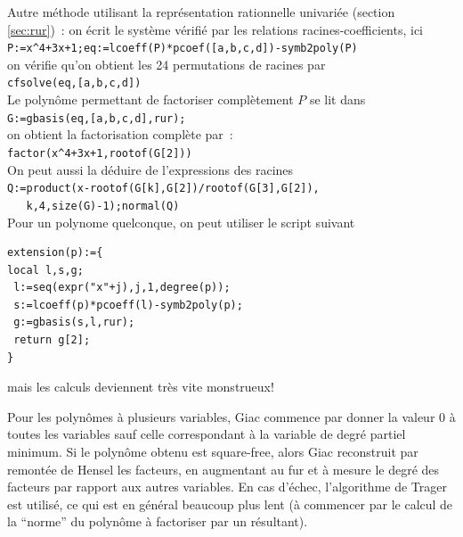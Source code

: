 \documentclass[a4paper,11pt]{article}
\begin{document}
\begin{giacjshere}
Autre m\'ethode utilisant la repr\'esentation rationnelle
univari\'ee (section \ref{sec:rur})~: 
on \'ecrit le syst\`eme v\'erifi\'e par les relations
racines-coefficients, ici\\
\verb|P:=x^4+3x+1;eq:=lcoeff(P)*pcoef([a,b,c,d])-symb2poly(P)|\\
on v\'erifie qu'on obtient les 24 permutations de racines par\\
\verb|cfsolve(eq,[a,b,c,d])|\\
Le polyn\^ome permettant de factoriser compl\`etement $P$ se lit dans\\
\verb|G:=gbasis(eq,[a,b,c,d],rur);|\\
on obtient la factorisation compl\`ete par~:\\
\verb|factor(x^4+3x+1,rootof(G[2]))|\\
On peut aussi la d\'eduire de l'expressions des racines\\
\verb|Q:=product(x-rootof(G[k],G[2])/rootof(G[3],G[2]),|\\
\verb|   k,4,size(G)-1);normal(Q)|\\
Pour un polynome quelconque, on peut utiliser le script suivant\\
\begin{verbatim}
extension(p):={
local l,s,g;
 l:=seq(expr("x"+j),j,1,degree(p));
 s:=lcoeff(p)*pcoeff(l)-symb2poly(p);
 g:=gbasis(s,l,rur);
 return g[2];
}
\end{verbatim}
mais les calculs deviennent tr\`es vite monstrueux!

Pour les polyn\^omes \`a plusieurs variables, Giac commence par donner
la valeur 0 \`a toutes les variables sauf celle correspondant \`a la variable de
degr\'e partiel minimum. Si le polyn\^ome obtenu est square-free, alors Giac
reconstruit par remont\'ee de Hensel les facteurs, en augmentant
au fur et \`a mesure le degr\'e des facteurs par rapport aux autres
variables. En cas d'\'echec, l'algorithme de Trager est utilis\'e,
ce qui est en g\'en\'eral beaucoup plus lent (\`a commencer par le
calcul de la ``norme'' du polyn\^ome \`a factoriser par un r\'esultant).


\end{giacjshere}
\end{document}
